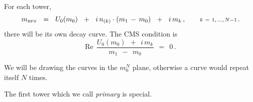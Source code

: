 \documentclass[12pt,letterpaper,landscape,KOMA,smallheadings,calcdimensions,display]{powersem}
\newcommand{\mbps}{m_{\text{\tiny BPS}}}
\begin{document}
\begin{slide}
\vspace*{2cm}

	For each tower,
\[
	\mbps ~~=~~ U_0 (m_0) ~~+~~ i\, n_{(k)} \cdot ( m_1 \,-\, m_0 ) ~~+~~ i\, m_k\,,
	\qquad {\scriptstyle k ~=~ 1,\,...,\, N-1\,}.
\]
	there will be its own decay curve.
	The CMS condition is 
\[
	\text{Re}~~ \frac{ U_0 (m_0) ~~+~~ i\, m_k }
                         { m_1 ~~-~~ m_0 }    ~~=~~ 0\,. 
\]

	We will be drawing the curves in the $ m_0^N $ plane, otherwise a curve would
	repeat itself $ N $ times.

\end{slide}


\begin{slide}

	The first tower which we call \emph{primary} is special. 


\end{slide}
\end{document}
